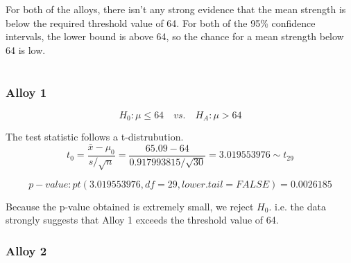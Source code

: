 \documentclass[letterpaper]{article}
\begin{document}
For both of the alloys, there isn't any strong evidence that the mean strength
is below the required threshold value of 64. For both of the 95\% confidence
intervals, the lower bound is above 64, so the chance for a mean strength below
64 is low.

\section{}%
\subsection{}%
%
\subsubsection*{Alloy 1}

$$H_0: \mu \leq 64 \quad vs. \quad H_A: \mu > 64 $$

The test statistic follows a t-distrubution.
$$t_0 = \frac{\bar{x}-\mu_0}{s/\sqrt{n}} = \frac{65.09 - 64}{0.917993815/\sqrt{30}} = 3.019553976  \sim t_{29}$$

$$ {p-value}: pt(3.019553976, df=29, lower.tail=FALSE) = 0.0026185 $$

Because the p-value obtained is extremely small, we reject $H_0$.
i.e. the data strongly suggests that Alloy 1 exceeds the threshold value of 64.

\subsubsection*{Alloy 2}
\end{document}
